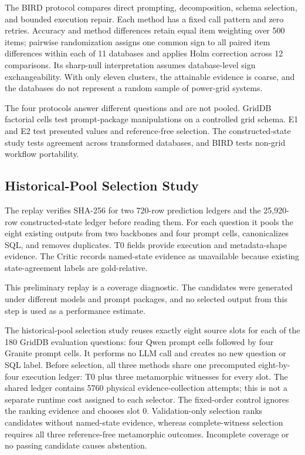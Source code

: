 \documentclass[applsci,article,submit,moreauthors]{Definitions/mdpi}
\begin{document}
The BIRD protocol compares direct prompting, decomposition, schema selection, and bounded execution repair. Each method has a fixed call pattern and zero retries. Accuracy and method differences retain equal item weighting over 500 items; pairwise randomization assigns one common sign to all paired item differences within each of 11 databases and applies Holm correction across 12 comparisons. Its sharp-null interpretation assumes database-level sign exchangeability. With only eleven clusters, the attainable evidence is coarse, and the databases do not represent a random sample of power-grid systems.

The four protocols answer different questions and are not pooled. GridDB factorial cells test prompt-package manipulations on a controlled grid schema. E1 and E2 test presented values and reference-free selection. The constructed-state study tests agreement across transformed databases, and BIRD tests non-grid workflow portability.

\subsection{Historical-Pool Selection Study}

The replay verifies SHA-256 for two 720-row prediction ledgers and the 25,920-row constructed-state ledger before reading them. For each question it pools the eight existing outputs from two backbones and four prompt cells, canonicalizes SQL, and removes duplicates. T0 fields provide execution and metadata-shape evidence. The Critic records named-state evidence as unavailable because existing state-agreement labels are gold-relative.

This preliminary replay is a coverage diagnostic. The candidates were generated under different models and prompt packages, and no selected output from this step is used as a performance estimate.

The historical-pool selection study reuses exactly eight source slots for each of the 180 GridDB evaluation questions: four Qwen prompt cells followed by four Granite prompt cells. It performs no LLM call and creates no new question or SQL label. Before selection, all three methods share one precomputed eight-by-four execution ledger: T0 plus three metamorphic witnesses for every slot. The shared ledger contains 5760 physical evidence-collection attempts; this is not a separate runtime cost assigned to each selector. The fixed-order control ignores the ranking evidence and chooses slot 0. Validation-only selection ranks candidates without named-state evidence, whereas complete-witness selection requires all three reference-free metamorphic outcomes. Incomplete coverage or no passing candidate causes abstention.
\end{document}
